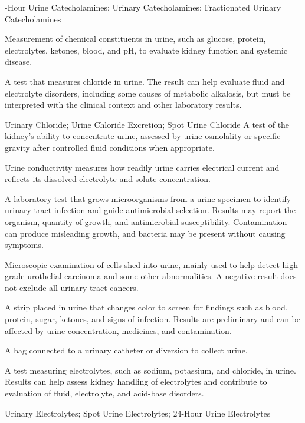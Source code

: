 -Hour Urine Catecholamines; Urinary Catecholamines; Fractionated Urinary Catecholamines

 Measurement of chemical constituents in urine, such as glucose, protein, electrolytes, ketones, blood, and pH, to evaluate kidney function and systemic disease.

 A test that measures chloride in urine. The result can help evaluate fluid and electrolyte disorders, including some causes of metabolic alkalosis, but must be interpreted with the clinical context and other laboratory results.

\synonyms
Urinary Chloride; Urine Chloride Excretion; Spot Urine Chloride
 A test of the kidney’s ability to concentrate urine, assessed by urine osmolality or specific gravity after controlled fluid conditions when appropriate.

 Urine conductivity measures how readily urine carries electrical current and reflects its dissolved electrolyte and solute concentration.

 A laboratory test that grows microorganisms from a urine specimen to identify urinary-tract infection and guide antimicrobial selection. Results may report the organism, quantity of growth, and antimicrobial susceptibility. Contamination can produce misleading growth, and bacteria may be present without causing symptoms.

 Microscopic examination of cells shed into urine, mainly used to help detect high-grade urothelial carcinoma and some other abnormalities. A negative result does not exclude all urinary-tract cancers.

 A strip placed in urine that changes color to screen for findings such as blood, protein, sugar, ketones, and signs of infection. Results are preliminary and can be affected by urine concentration, medicines, and contamination.

 A bag connected to a urinary catheter or diversion to collect urine.

 A test measuring electrolytes, such as sodium, potassium, and chloride, in urine. Results can help assess kidney handling of electrolytes and contribute to evaluation of fluid, electrolyte, and acid-base disorders.

\synonyms
Urinary Electrolytes; Spot Urine Electrolytes; 24-Hour Urine Electrolytes

